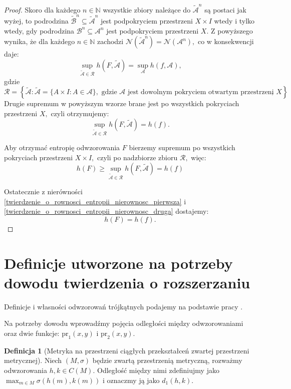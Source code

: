 \documentclass[licencjacka]{pwr_wmat_praca_dyplomowa}
\theoremstyle{plain}
\numberwithin{theorem}{chapter}
\theoremstyle{definition}
\numberwithin{theorem}{chapter}
\newtheorem{definition}[theorem]{Definicja}
\begin{document}
\begin{proof}
Skoro dla każdego $n \in \mathbb{N}$ wszystkie zbiory należące do ${\widetilde{\mathcal{A}}}^n$ są postaci jak wyżej, to podrodzina ${\widetilde{\mathcal{B}}}^n \subseteq {\widetilde{\mathcal{A}}}^n$ jest podpokryciem przestrzeni $X \times I$ wtedy i tylko wtedy, gdy podrodzina $\mathcal{B}^n \subseteq \mathcal{A}^n$ jest podpokryciem przestrzeni $X.$
Z powyższego wynika, że dla każdego $n \in \mathbb{N}$ zachodzi
$\mathcal{N}\left({\widetilde{\mathcal{A}}}^n\right) = \mathcal{N}(\mathcal{A}^n),$
co w konsekwencji daje:
$$\sup_{\widetilde{\mathcal{A}} \in \mathcal{R}} h(F, \widetilde{\mathcal{A}}) = \sup_{\mathcal{A}} h(f, \mathcal{A}),$$
gdzie 
$$\mathcal{R} = \left\{\widetilde{\mathcal{A}} : \widetilde{\mathcal{A}} = \{A \times I : A \in \mathcal{A}\}, \textrm{ gdzie } \mathcal{A} \textrm{ jest dowolnym pokryciem otwartym przestrzeni } X\right\},$$
Drugie supremum w powyższym wzorze brane jest po wszystkich pokryciach przestrzeni $X,$ czyli otrzymujemy:
$$\sup_{\widetilde{\mathcal{A}} \in \mathcal{R}} h(F, \widetilde{\mathcal{A}}) = h(f).$$

Aby otrzymać entropię odwzorowania $F$ bierzemy supremum po wszystkich pokryciach przestrzeni $X \times I,$ czyli po nadzbiorze zbioru $\mathcal{R},$ więc:
\begin{equation}
\label{twierdzenie_o_rownosci_entropii_nierownosc_druga}
h(F) \geq \sup_{\widetilde{\mathcal{A}} \in \mathcal{R}} h(F, \widetilde{\mathcal{A}})  = h(f)
\end{equation}


Ostatecznie z nierówności \ref{twierdzenie_o_rownosci_entropii_nierownosc_pierwsza} i \ref{twierdzenie_o_rownosci_entropii_nierownosc_druga} dostajemy:
$$h(F) = h(f).$$


\end{proof}



\section{Definicje utworzone na potrzeby dowodu twierdzenia o rozszerzaniu}
Definicje i własności odwzorowań trójkątnych podajemy na podstawie pracy \cite{balibrea2003topological}.

Na potrzeby dowodu wprowadźmy pojęcia odległości między odwzorowaniami oraz dwie funkcje: $\textrm{pr}_1(x, y)$ i $\textrm{pr}_2(x, y)$. 

\begin{definition}[Metryka na przestrzeni ciągłych przekształceń zwartej przestrzeni metrycznej]
\label{definicja_metryki_d_jeden}
Niech $(M, \sigma)$ będzie zwartą przestrzenią metryczną, rozważmy odwzorowania $h,k \in C(M)$. Odległość między nimi zdefiniujmy jako $\max_{m \in M} \sigma(h(m), k(m))$ i oznaczmy ją jako $d_1(h,k)$.
\end{definition}
\end{document}

